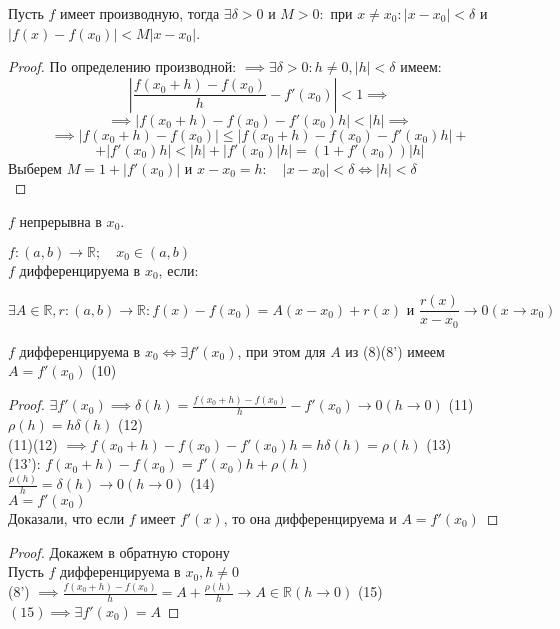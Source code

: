 \begin{theorem}
	Пусть $f$ имеет производную, тогда $\exists \delta >0$ и $M>0:$ при $x\neq x_0: |x-x_0|<\delta$ и $|f(x)-f(x_0)|<M|x-x_0|$.
\end{theorem}

\begin{proof}
	По определению производной: $\implies \exists \delta>0: h\neq 0, |h|<\delta$ имеем:\\
	$$|\displaystyle\frac{f(x_0+h)-f(x_0)}{h}-f'(x_0)|<1 \implies$$
	$$\implies |f(x_0+h)-f(x_0)-f'(x_0)h|<|h| \implies$$ 
	$$\implies |f(x_0+h)-f(x_0)|\le |f(x_0+h)-f(x_0)-f'(x_0)h|+$$
	$$+|f'(x_0)h| < |h|+|f'(x_0)|h|=(1+f'(x_0))|h|$$
	Выберем $M=1+|f'(x_0)|$ и $x - x_0 = h: \quad |x-x_0|<\delta \iff |h| < \delta$\\
\end{proof}

\begin{impl}
	$f$ непрерывна в $x_0$.
\end{impl}

\begin{definition}
	$f:(a,b) \to \mathbb{R}; \quad x_0 \in (a,b)$ \\
	$f$ дифференцируема в  $x_0$, если:

	$$\exists A \in \mathbb{R}, r: (a,b) \to \mathbb{R}: f(x)-f(x_0)=A(x-x_0)+r(x) \text{ и } \displaystyle\frac{r(x)}{x-x_0}\to 0 (x\to x_0)$$

\end{definition}
\begin{theorem}
	$f$ дифференцируема в $x_0 \iff \exists f'(x_0)$, при этом для $A$ из (8)(8') имеем $A=f'(x_0)$ (10)\\
\end{theorem}
\begin{proof}
	$\exists f'(x_0) \implies \delta(h)=\displaystyle\frac{f(x_0+h)-f(x_0)}{h}-f'(x_0)\to 0 (h\to 0)$ (11)\\
	$\rho(h)=h\delta(h)$ (12)\\
	(11)(12) $\implies f(x_0+h)-f(x_0)-f'(x_0)h=h\delta(h)=\rho(h)$ (13)\\
	(13'): $f(x_0+h)-f(x_0)=f'(x_0)h+\rho(h)$ \\
	$\displaystyle\frac{\rho(h)}{h}=\delta(h)\to 0(h\to 0)$ (14)\\
	$A=f'(x_0)$ \\
	Доказали, что если $f$ имеет  $f'(x)$, то она дифференцируема и $A=f'(x_0)$
\end{proof}
\begin{proof}
	Докажем в обратную сторону\\
	Пусть $f$ дифференцируема в  $x_0, h\neq 0$\\
	(8') $\implies \displaystyle\frac{f(x_0+h)-f(x_0)}{h}=A+\displaystyle\frac{\rho(h)}{h} \to A \in \mathbb{R} (h \to 0)$ (15)\\
	$(15) \implies \exists f'(x_0)=A$
\end{proof}


